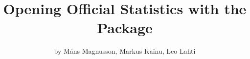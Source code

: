 \title{Opening Official Statistics with the  Package}
\author{by Måns Magnusson, Markus Kainu, Leo Lahti}

\maketitle





\address{Leo Lahti\\
  Department of Mathematics and Statistics\\
  PO Box 20014 University of Turku\\
  Finland\\}


\address{Markus Kainu\\
  Research Department, The Social Insurance Institution of Finland\\
  PO Box 450, 00101 Helsinki\\
  Finland\\}

